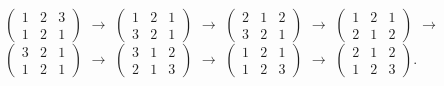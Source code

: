 \documentclass[12pt]{article}
\begin{document}
{\footnotesize$\left(\begin{array}{ccc} 1 & 2 & 3 \\ 1 & 2 & 1   \end{array}\right)$} $\rightarrow$
{\footnotesize$\left(\begin{array}{ccc} 1 & 2 & 1 \\ 3 & 2 & 1   \end{array}\right)$} $\rightarrow$
{\footnotesize$\left(\begin{array}{ccc} 2 & 1 & 2 \\ 3 & 2 & 1   \end{array}\right)$} $\rightarrow$
{\footnotesize$\left(\begin{array}{ccc} 1 & 2 & 1 \\ 2 & 1 & 2   \end{array}\right)$} $\rightarrow$
{\footnotesize$\left(\begin{array}{ccc} 3 & 2 & 1 \\ 1 & 2 & 1   \end{array}\right)$} $\rightarrow$
{\footnotesize$\left(\begin{array}{ccc} 3 & 1 & 2 \\ 2 & 1 & 3   \end{array}\right)$} $\rightarrow$
{\footnotesize$\left(\begin{array}{ccc} 1 & 2 & 1 \\ 1 & 2 & 3   \end{array}\right)$} $\rightarrow$
{\footnotesize$\left(\begin{array}{ccc} 2 & 1 & 2 \\ 1 & 2 & 3   \end{array}\right)$}.
\end{document}
